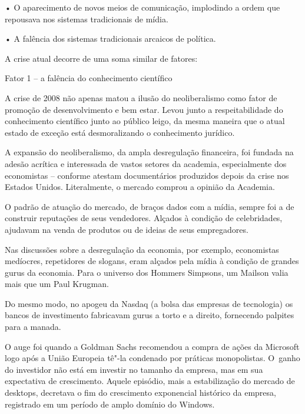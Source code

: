 • O aparecimento de novos meios de comunicação, implodindo a ordem que
repousava nos sistemas tradicionais de mídia.

 

• A falência dos sistemas tradicionais arcaicos de política.

 

A crise atual decorre de uma soma similar de fatores:

 

Fator 1 -- a falência do conhecimento científico

 

A crise de 2008 não apenas matou a ilusão do neoliberalismo como fator
de promoção de desenvolvimento e bem estar. Levou junto a
respeitabilidade do conhecimento científico junto ao público leigo, da
mesma maneira que o atual estado de exceção está desmoralizando o
conhecimento jurídico.

 

A expansão do neoliberalismo, da ampla desregulação financeira, foi
fundada na adesão acrítica e interessada de vastos setores da academia,
especialmente dos economistas -- conforme atestam documentários
produzidos depois da crise nos Estados Unidos. Literalmente, o mercado
comprou a opinião da Academia.

 

O padrão de atuação do mercado, de braços dados com a mídia, sempre foi
a de construir reputações de seus vendedores. Alçados à condição de
celebridades, ajudavam na venda de produtos ou de ideias de seus
empregadores.

 

Nas discussões sobre a desregulação da economia, por exemplo,
economistas medíocres, repetidores de slogans, eram alçados pela mídia à
condição de grandes gurus da economia. Para o universo dos Hommers
Simpsons, um Mailson valia mais que um Paul Krugman.

 

Do mesmo modo, no apogeu da Nasdaq (a bolsa das empresas de tecnologia)
os bancos de investimento fabricavam gurus a torto e a direito,
fornecendo palpites para a manada.

 

O auge foi quando a Goldman Sachs recomendou a compra de ações da
Microsoft logo após a União Europeia tê"-la condenado por práticas
monopolistas. O~ganho do investidor não está em investir no tamanho da
empresa, mas em sua expectativa de crescimento. Aquele episódio, mais a
estabilização do mercado de desktops, decretava o fim do crescimento
exponencial histórico da empresa, registrado em um período de amplo
domínio do Windows.~


